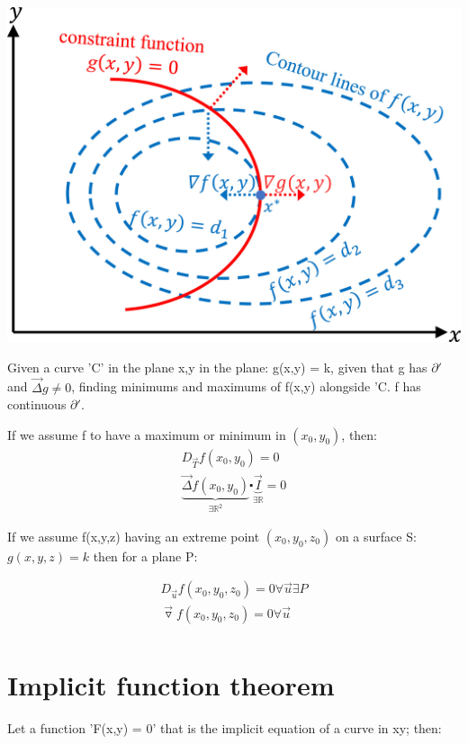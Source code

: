 \documentclass[11pt,fleqn]{book} %
\begin{document}
\begin{center}
    \includegraphics*[]{Pictures/lagrange.jpg}
\end{center}

Given a curve 'C' in the plane x,y in the plane: g(x,y) = k,
given that g has $\partial '$ and $\vec{\Delta} g \neq 0$,
finding minimums and maximums of f(x,y) alongside 'C.
f has continuous $\partial '$. 

If we assume f to have a maximum or minimum in $(x_0, y_0)$, then:
\begin{gather}
    D_{\vec{T}}f(x_0,y_0) = 0 \\
    \underbrace{\vec{\Delta}f(x_0,y_0)}_{\exists \mathbb{R}^2} \centerdot \underbrace{\vec{I}}_{\exists \mathbb{R}} = 0
\end{gather}

If we assume f(x,y,z) having an extreme point $(x_0,y_0,z_0)$ on a surface S:
$g(x,y,z) = k$ then for a plane P:

\begin{gather}
    D_{\vec{u}}f(x_0,y_0,z_0) = 0 \forall \vec{u} \exists P \\
    \vec{\triangledown} f(x_0,y_0,z_0) = 0 \forall \vec{u}\\
\end{gather}

\section{Implicit function theorem}

Let a function 'F(x,y) = 0' that is the implicit equation of a curve in xy;
then:
\end{document}
